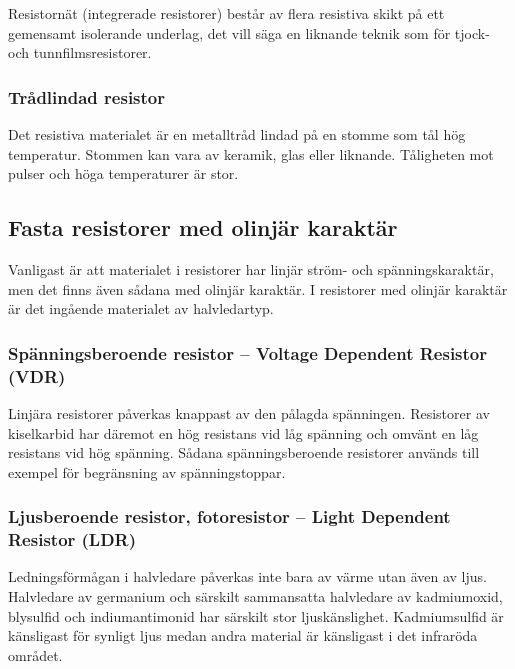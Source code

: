 Resistornät (integrerade resistorer) består av flera resistiva skikt på ett
gemensamt isolerande underlag, det vill säga en liknande teknik som för tjock- 
och tunnfilmsresistorer.

\subsubsection{Trådlindad resistor}

Det resistiva materialet är en metalltråd lindad på en stomme som tål hög
temperatur.
Stommen kan vara av keramik, glas eller liknande.
Tåligheten mot pulser och höga temperaturer är stor.

\subsection{Fasta resistorer med olinjär karaktär}
\label{fasta_resistorer_olinjära}

Vanligast är att materialet i resistorer har linjär ström- och
spänningskaraktär, men det finns även sådana med olinjär karaktär.
I resistorer med olinjär karaktär är det ingående materialet av halvledartyp.

\subsubsection{Spänningsberoende resistor -- Voltage Dependent Resistor (VDR)}

Linjära resistorer påverkas knappast av den pålagda spänningen.
Resistorer av kiselkarbid har däremot en hög resistans vid låg spänning och
omvänt en låg resistans vid hög spänning.
Sådana spänningsberoende resistorer används till exempel för begränsning av
spänningstoppar.

\subsubsection{Ljusberoende resistor, fotoresistor -- Light Dependent Resistor (LDR)}

Ledningsförmågan i halvledare påverkas inte bara av värme utan även av ljus.
Halvledare av germanium och särskilt sammansatta halvledare av kadmiumoxid,
blysulfid och indiumantimonid har särskilt stor ljuskänslighet. Kadmiumsulfid
är känsligast för synligt ljus medan andra material är känsligast i det
infraröda området.

